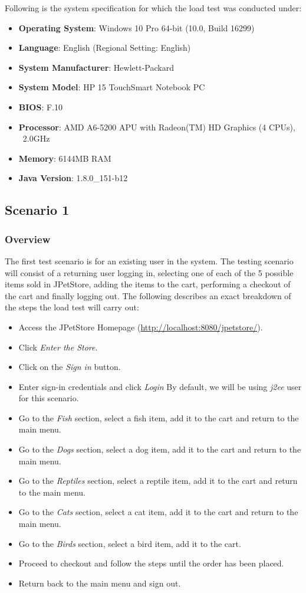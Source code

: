 \documentclass[fontsize=12pt,paper=letter,twoside]{scrartcl}
\begin{document}
\bigskip
\noindent Following is the system specification for which the load test was conducted under:
\begin{itemize}
\item \textbf{Operating System}: Windows 10 Pro 64-bit (10.0, Build 16299)
\item \textbf{Language}: English (Regional Setting: English)
\item \textbf{System Manufacturer}: Hewlett-Packard
\item \textbf{System Model}: HP 15 TouchSmart Notebook PC
\item \textbf{BIOS}: F.10
\item \textbf{Processor}: AMD A6-5200 APU with Radeon(TM) HD Graphics (4 CPUs), ~2.0GHz
\item \textbf{Memory}: 6144MB RAM
\item \textbf{Java Version}: 1.8.0\_151-b12
\end{itemize}


\subsection{Scenario 1}

\subsubsection{Overview}
The first test scenario is for an existing user in the system. The testing scenario will consist of a returning user logging in, selecting one of each of the 5 possible items sold in JPetStore, adding the items to the cart, performing a checkout of the cart and finally logging out. The following describes an exact breakdown of the steps the load test will carry out:

\begin{itemize}
\item Access the JPetStore Homepage (\url{http://localhost:8080/jpetstore/}).
\item Click \emph{Enter the Store}.
\item Click on the \emph{Sign in} button.
\item Enter sign-in credentials and click \emph{Login} By default, we will be using \emph{j2ee} user for this scenario.
\item Go to the \emph{Fish} section, select a fish item, add it to the cart and return to the main menu.
\item Go to the \emph{Dogs} section, select a dog item, add it to the cart and return to the main menu.
\item Go to the \emph{Reptiles} section, select a reptile item, add it to the cart and return to the main menu.
\item Go to the \emph{Cats} section, select a cat item, add it to the cart and return to the main menu.
\item Go to the \emph{Birds} section, select a bird item, add it to the cart.
\item Proceed to checkout and follow the steps until the order has been placed.
\item Return back to the main menu and sign out.
\end{itemize}
\end{document}
